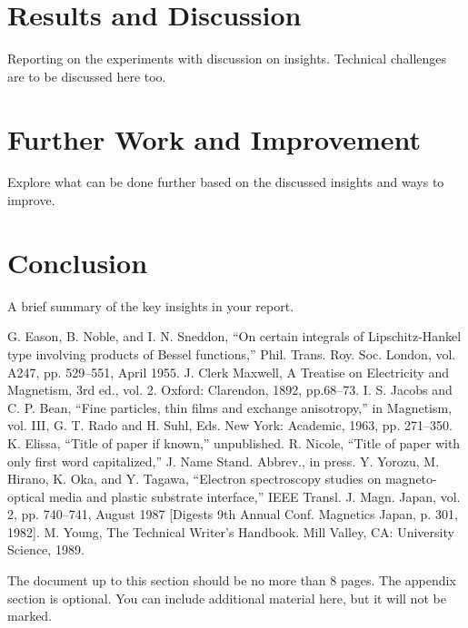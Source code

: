 \documentclass[conference]{IEEEtran}
\begin{document}
	
	\section{Results and Discussion}
	{\color{blue}Reporting on the experiments with discussion on insights. Technical challenges are to be discussed here too.}
	
	\section{Further Work and Improvement}
	{\color{blue}Explore what can be done further based on the discussed insights and ways to improve.}
	
	\section{Conclusion}
	{\color{blue}A brief summary of the key insights in your report.}
	
	\begin{thebibliography}{00}
		 G. Eason, B. Noble, and I. N. Sneddon, ``On certain integrals of Lipschitz-Hankel type involving products of Bessel functions,'' Phil. Trans. Roy. Soc. London, vol. A247, pp. 529--551, April 1955.
		 J. Clerk Maxwell, A Treatise on Electricity and Magnetism, 3rd ed., vol. 2. Oxford: Clarendon, 1892, pp.68--73.
		 I. S. Jacobs and C. P. Bean, ``Fine particles, thin films and exchange anisotropy,'' in Magnetism, vol. III, G. T. Rado and H. Suhl, Eds. New York: Academic, 1963, pp. 271--350.
		 K. Elissa, ``Title of paper if known,'' unpublished.
		 R. Nicole, ``Title of paper with only first word capitalized,'' J. Name Stand. Abbrev., in press.
		 Y. Yorozu, M. Hirano, K. Oka, and Y. Tagawa, ``Electron spectroscopy studies on magneto-optical media and plastic substrate interface,'' IEEE Transl. J. Magn. Japan, vol. 2, pp. 740--741, August 1987 [Digests 9th Annual Conf. Magnetics Japan, p. 301, 1982].
		 M. Young, The Technical Writer's Handbook. Mill Valley, CA: University Science, 1989.
	\end{thebibliography}
	
	\appendix
	{\color{blue}The document up to this section should be no more than 8 pages. The appendix section is optional. You can include additional material here, but it will not be marked.}
	
\end{document}
